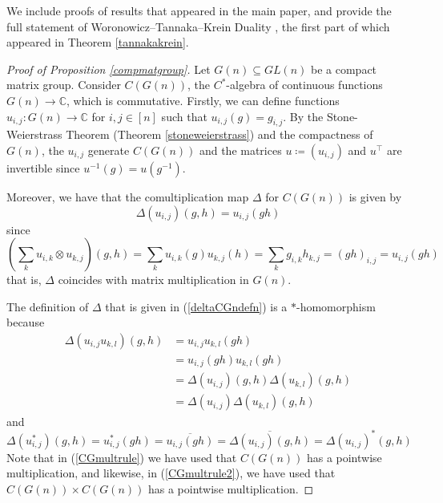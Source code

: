 \documentclass{article}
\theoremstyle{plain}
\theoremstyle{definition}
\theoremstyle{remark}
\begin{document}
We include proofs of results that appeared in the main paper, and 
provide the full statement of Woronowicz--Tannaka--Krein Duality
\citep{woronowicz1988}, the first part of which appeared in
Theorem \ref{tannakakrein}.

\begin{proof}[Proof of Proposition \ref{compmatgroup}]
	Let $G(n) \subseteq GL(n)$ be a compact matrix group. 
	Consider $C(G(n))$, the $C^{*}$-algebra of continuous functions 
	$G(n) \rightarrow \mathbb{C}$, which is commutative.
	Firstly, we can define functions
	$u_{i,j} : G(n) \rightarrow \mathbb{C}$ 
	for $i,j \in [n]$
	such that $u_{i,j}(g) = g_{i,j}$. 
	By the Stone-Weierstrass Theorem (Theorem \ref{stoneweierstrass}) 
	and the compactness of $G(n)$,
	the $u_{i,j}$ generate $C(G(n))$ 
	and the matrices $u \coloneqq (u_{i,j})$ and $u^\top$ are invertible
	since $u^{-1}(g) = u(g^{-1})$.

	Moreover, we have that the comultiplication map $\Delta$ for $C(G(n))$
	is given by 
	\begin{equation} \label{deltaCGndefn}
		\Delta(u_{i,j})(g,h) = u_{i,j}(gh)
	\end{equation}
since
	\begin{equation} 
	\left(
	\sum_k 
	u_{i,k} \otimes u_{k,j}
	\right)
	(g, h)
	=
	\sum_k 
	u_{i,k}(g)
	u_{k,j}(h) 
	=
	\sum_k 
	g_{i,k}
	h_{k,j}
	=
	(gh)_{i,j}
	=
	u_{i,j}(gh)
	\end{equation}
that is, $\Delta$ coincides with matrix multiplication in $G(n)$.
	
	The definition of $\Delta$ that is given in (\ref{deltaCGndefn}) 
	is a $*$-homomorphism because
	\begin{align}
		\Delta(u_{i,j}u_{k,l})(g,h)
		& =
		u_{i,j}u_{k,l}(gh) \\
		& =
		u_{i,j}(gh)u_{k,l}(gh) \label{CGmultrule} \\
		& =
		\Delta(u_{i,j})(g,h)\Delta(u_{k,l})(g,h) \\
		& =
		\Delta(u_{i,j})\Delta(u_{k,l})(g,h) \label{CGmultrule2}
	\end{align}
	and
	\begin{equation}
		\Delta(u_{i,j}^*)(g,h) 
		= 
		u_{i,j}^*(gh)
		=
		\overline{u_{i,j}(gh)}
		=
		\overline{\Delta(u_{i,j})(g,h)}
		=
		\Delta(u_{i,j})^*(g,h) 
	\end{equation}
	Note that in (\ref{CGmultrule}) we have used that $C(G(n))$ has a pointwise
	multiplication, and likewise, in (\ref{CGmultrule2}), we have used
	that $C(G(n)) \times C(G(n))$ has a pointwise multiplication.
\end{proof}
\end{document}
